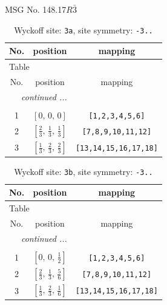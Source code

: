 \documentclass[fleqn,8pt]{jsarticle}
\begin{document}
\setcounter{MaxMatrixCols}{32}

\renewcommand{\tablename}{Table~}
\renewcommand{\figurename}{Figure~}
\begin{center}
\LARGE
MSG No. 148.17\quad$R\bar{3}$
\end{center}
\renewcommand{\arraystretch}{1.2}
\begin{longtable}{ccc}
\caption{Wyckoff site: {\tt 3a}, site symmetry: {\tt -3..}}
 \\
 \hline \hline
No. & position & mapping \\ \hline \endfirsthead

\multicolumn{2}{l}{\tablename\ \thetable{}} \\
 \hline \hline
No. & position & mapping \\ \hline \endhead

 \hline \hline
\multicolumn{2}{r}{\footnotesize\it continued ...} \\ \endfoot

 \hline \hline
\multicolumn{2}{r}{} \\ \endlastfoot

1 & $\left[ 0,\, 0,\, 0 \right]$ & {\tt [1,2,3,4,5,6]} \\ \hline
2 & $\left[ \frac{2}{3},\, \frac{1}{3},\, \frac{1}{3} \right]$ & {\tt [7,8,9,10,11,12]} \\ \hline
3 & $\left[ \frac{1}{3},\, \frac{2}{3},\, \frac{2}{3} \right]$ & {\tt [13,14,15,16,17,18]} \\
\end{longtable}
\renewcommand{\arraystretch}{1.2}
\begin{longtable}{ccc}
\caption{Wyckoff site: {\tt 3b}, site symmetry: {\tt -3..}}
 \\
 \hline \hline
No. & position & mapping \\ \hline \endfirsthead

\multicolumn{2}{l}{\tablename\ \thetable{}} \\
 \hline \hline
No. & position & mapping \\ \hline \endhead

 \hline \hline
\multicolumn{2}{r}{\footnotesize\it continued ...} \\ \endfoot

 \hline \hline
\multicolumn{2}{r}{} \\ \endlastfoot

1 & $\left[ 0,\, 0,\, \frac{1}{2} \right]$ & {\tt [1,2,3,4,5,6]} \\ \hline
2 & $\left[ \frac{2}{3},\, \frac{1}{3},\, \frac{5}{6} \right]$ & {\tt [7,8,9,10,11,12]} \\ \hline
3 & $\left[ \frac{1}{3},\, \frac{2}{3},\, \frac{1}{6} \right]$ & {\tt [13,14,15,16,17,18]} \\
\end{longtable}
\end{document}
